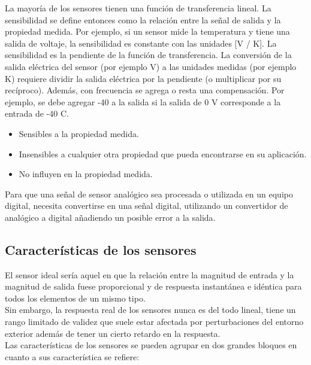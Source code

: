La mayoría de los sensores tienen una función de transferencia lineal. La sensibilidad se define entonces como la relación entre la señal de salida y la propiedad medida. 
Por ejemplo, si un sensor mide la temperatura y tiene una salida de voltaje, la sensibilidad es constante con las unidades [V / K]. La sensibilidad es la pendiente de la función 
de transferencia. La conversión de la salida eléctrica del sensor (por ejemplo V) a las unidades medidas (por ejemplo K) requiere dividir la salida eléctrica por la pendiente 
(o multiplicar por su recíproco). Además, con frecuencia se agrega o resta una compensación. Por ejemplo, se debe agregar -40 a la salida si la salida de 0 V corresponde a la 
entrada de -40 \textdegree C.\\

\begin{itemize}
 \item Sensibles a la propiedad medida.
 \item Insensibles a cualquier otra propiedad que pueda encontrarse en su aplicación.
 \item No influyen en la propiedad medida.
\end{itemize}

Para que una señal de sensor analógico sea procesada o utilizada en un equipo digital, necesita convertirse en una señal digital, utilizando un convertidor de analógico a 
digital añadiendo un posible error a la salida.\\



\subsection{Características de los sensores}

El sensor  ideal  sería  aquel  en  que  la  relación  entre la magnitud de entrada y la 
magnitud de salida fuese proporcional y de respuesta instantánea e idéntica para todos los elementos de un mismo tipo. \\

Sin  embargo, la respuesta real de los sensores  nunca  es del todo lineal, tiene un rango  limitado  de  validez que  suele  estar afectada por perturbaciones del entorno exterior además de tener un cierto retardo en la respuesta. \\

Las características de los sensores se pueden agrupar en dos grandes bloques en cuanto a sus característica se refiere:\\

